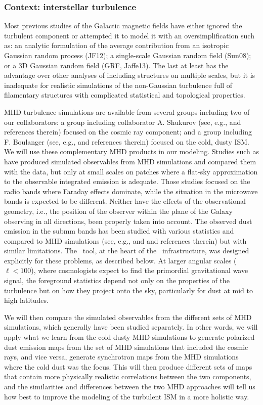 \subsubsection*{Context:  interstellar turbulence}

Most previous studies of the Galactic magnetic fields have either ignored the turbulent component or attempted it to model it with an oversimplification such as: an analytic formulation of the average contribution from an isotropic Gaussian random process (JF12); a single-scale Gaussian random field (Sun08); or a 3D Gaussian random field (GRF, Jaffe13). The last at least has the advantage over other analyses of including structures on multiple  scales, but it is inadequate for realistic simulations of the non-Gaussian turbulence full of filamentary structures with complicated statistical and topological properties.

MHD turbulence simulations are available from several groups including two of our collaborators:  a group including collaborator A. Shukurov (see, e.g., \citealt{evirgen:2017} and references therein) focused on the cosmic ray component;  and a group including F. Boulanger (see, e.g., \citealt{pipXX} and references therein) focused on the cold, dusty ISM.  We will use these complementary MHD products in our modeling. Studies such as \citet{Burkhart:2012} have produced simulated observables from MHD simulations and compared them with the data, but only at small scales on patches where a flat-sky approximation to the observable integrated emission is adequate. Those studies focused on the radio bands where Faraday effects dominate, while the situation in the microwave bands is expected to be different. Neither have the effects of the observational geometry, i.e., the position of the observer within the plane of the Galaxy observing in all directions, been properly taken into account.  The observed dust emission in the submm bands has been studied with various statistics and compared to MHD simulations (see, e.g., \citealt{pipXX} and \citealt{pipLIV} and references therein) but with similar limitations. The \hammurabi\ tool, at the heart of the \imagineSW\ infrastructure, was designed explicitly for these problems, as described below.   At larger angular scales ($\ell < 100$), where cosmologists expect to find the primordial gravitational wave signal, the foreground statistics depend not only on the properties of the turbulence but on how they project onto the sky, particularly for dust at mid to high latitudes.  

We will then compare the simulated observables from the different sets of MHD simulations, which generally have been studied separately. In other words, we will apply what we learn from the cold dusty MHD simulations to generate polarized dust emission maps from the set of MHD simulations that included the cosmic rays, and vice versa, generate synchrotron maps from the MHD simulations where the cold dust was the focus. This will then produce different sets of maps that contain more physically realistic correlations between the two components, and the similarities and differences between the two MHD approaches will tell us how best to improve the modeling of the turbulent ISM in a more holistic way. 

